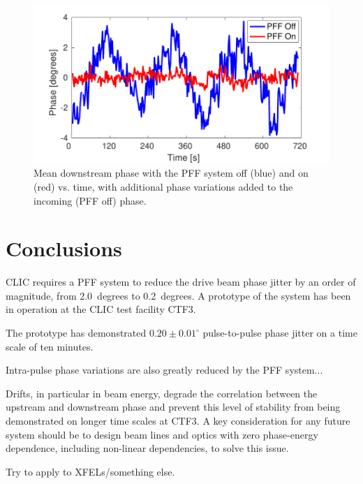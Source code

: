 \documentclass[%
 reprint,
 amsmath,amssymb,
 prl,
]{revtex4-1}
\begin{document}
\begin{figure}
	\includegraphics[width=\columnwidth]{figs/wiggle}%
	\caption{\label{fig:wiggle}Mean downstream phase with the PFF system off 
	(blue) and on (red) vs. time, with additional phase variations added to the 
	incoming (PFF off) phase.}
\end{figure}

%
%
%

\section{\label{s:conc}Conclusions}

CLIC requires a PFF system to reduce the drive beam phase jitter by an order of 
magnitude, from 2.0~degrees to 0.2~degrees. A prototype of the system has been 
in operation at the CLIC test facility CTF3.

The prototype has demonstrated \(0.20\pm0.01^\circ\) pulse-to-pulse 
phase jitter on a time scale of ten minutes. 

Intra-pulse phase variations are also greatly reduced by the PFF system...

Drifts, in particular in beam energy, degrade the correlation between the 
upstream and downstream phase and prevent this level of stability from being 
demonstrated on longer time scales at CTF3. A key consideration for any future 
system should be to design beam lines and optics with zero phase-energy 
dependence, including non-linear dependencies, to solve this issue.

Try to apply to XFELs/something else.

\end{document}
